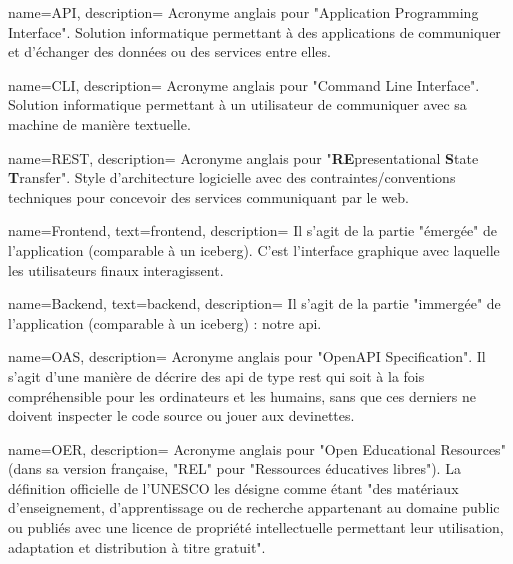 



{
    name={API},
    description={
        Acronyme anglais pour "Application Programming Interface".
        Solution informatique permettant à des applications de communiquer et d'échanger des données ou des services entre elles.
    }
}

{
    name={CLI},
    description={
        Acronyme anglais pour "Command Line Interface".
        Solution informatique permettant à un utilisateur de communiquer avec sa machine de manière textuelle.
    }
}

{
    name={REST},
    description={
        Acronyme anglais pour "\textbf{RE}presentational \textbf{S}tate \textbf{T}ransfer".
        Style d'architecture logicielle avec des contraintes/conventions techniques pour concevoir des services communiquant par le web.
    }
}

{
    name={Frontend},
    text={frontend},
    description={
        Il s'agit de la partie "émergée" de l'application (comparable à un iceberg). C'est l'interface graphique avec laquelle les utilisateurs finaux interagissent.  
    }
}

{
    name={Backend},
    text={backend},
    description={
        Il s'agit de la partie "immergée" de l'application (comparable à un iceberg) : notre \Gls{api}.
    }
}

{
    name={OAS},
    description={
        Acronyme anglais pour "OpenAPI Specification".
        Il s'agit d'une manière de décrire des \Gls{api} de type \Gls{rest} qui soit à la fois compréhensible pour les ordinateurs et les humains, sans que ces derniers ne doivent inspecter le code source ou jouer aux devinettes.
    }
}

{
    name={OER},
    description={
        Acronyme anglais pour "Open Educational Resources" (dans sa version française, "REL" pour "Ressources éducatives libres").
        La définition officielle de l'UNESCO\cite{UNESCO} les désigne comme étant "des matériaux d’enseignement, d'apprentissage ou de recherche appartenant au domaine public ou publiés avec une licence de propriété intellectuelle permettant leur utilisation, adaptation et distribution à titre gratuit".
    }
}

